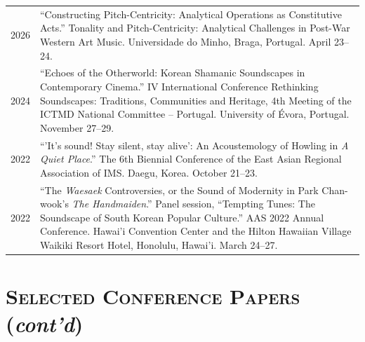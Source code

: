 \documentclass[a4paper,11pt,draft]{article}
\begin{document}
\begin{tabular}{p{2.5cm} p{12.5cm}}
    2026 & ``Constructing Pitch-Centricity: Analytical Operations as Constitutive Acts.'' Tonality and Pitch-Centricity: Analytical Challenges in Post-War Western Art Music. Universidade do Minho, Braga, Portugal. April 23–24.\\[2mm]
    
  	2024 & ``Echoes of the Otherworld: Korean Shamanic Soundscapes in Contemporary Cinema.'' IV International Conference Rethinking Soundscapes: Traditions, Communities and Heritage, 4th Meeting of the ICTMD National Committee – Portugal. University of Évora, Portugal. November 27--29.\\[2mm]
  	
    2022 & ``'It's sound! Stay silent, stay alive': An Acoustemology of Howling in \textit{A Quiet Place}.'' The 6th Biennial Conference of the East Asian Regional Association of IMS. Daegu, Korea. October 21--23.\\[2mm]
    
    2022 & ``The \textit{Waesaek} Controversies, or the Sound of Modernity in Park Chan-wook's \textit{The Handmaiden}.'' Panel session, ``Tempting Tunes: The Soundscape of South Korean Popular Culture.'' AAS 2022 Annual Conference. Hawai'i Convention Center and the Hilton Hawaiian Village Waikiki Resort Hotel, Honolulu, Hawai'i. March 24--27.
  \end{tabular}
  
  \vspace*{5mm}
  
  \section*{\textsc{Selected Conference Papers} (\textit{cont'd})}
  
\end{document}
